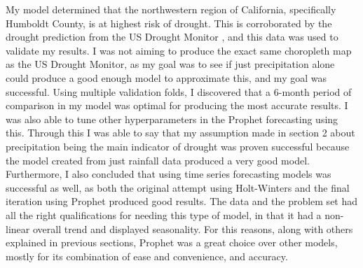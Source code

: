 \documentclass{article}
\begin{document}
My model determined that the northwestern region of California, specifically Humboldt County, is at highest risk of drought. This is corroborated by the drought prediction from the US Drought Monitor \cite{drought}, and this data was used to validate my results. I was not aiming to produce the exact same choropleth map as the US Drought Monitor, as my goal was to see if just precipitation alone could produce a good enough model to approximate this, and my goal was successful. Using multiple validation folds, I discovered that a 6-month period of comparison in my model was optimal for producing the most accurate results. I was also able to tune other hyperparameters in the Prophet forecasting using this. Through this I was able to say that my assumption made in section 2 about precipitation being the main indicator of drought was proven successful because the model created from just rainfall data produced a very good model. Furthermore, I also concluded that using time series forecasting models was successful as well, as both the original attempt using Holt-Winters and the final iteration using Prophet produced good results. The data and the problem set had all the right qualifications for needing this type of model, in that it had a non-linear overall trend and displayed seasonality. For this reasons, along with others explained in previous sections, Prophet was a great choice over other models, mostly for its combination of ease and convenience, and accuracy. 






\end{document}
